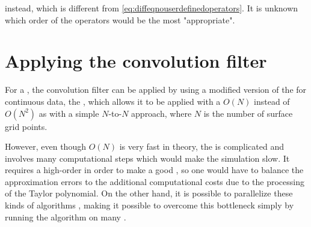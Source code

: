 instead, which is different from \eqref{eq:diffeqnouserdefinedoperators}. It is unknown which order of the operators would be the most "appropriate".

\section{Applying the convolution filter}

For a , the convolution filter can be applied by using a modified version of the \FMM{} \citep{Greengard1985,Greengard1987a} for continuous data, the \CFMM{} \citep{White1994}, which allows it to be applied with a $O(N)$  instead of $O(N^2)$ as with a simple $N$-to-$N$ approach, where $N$ is the number of surface grid points.

However, even though $O(N)$ is very fast in theory, the \CFMM is complicated and involves many computational steps which would make the simulation slow. It requires a high-order  in order to make a good \approximation, so one would have to balance the approximation errors to the additional computational costs due to the processing of the Taylor polynomial. On the other hand, it is possible to parallelize these kinds of algorithms \citep[see e.g.][]{Board1994}, making it possible to overcome this bottleneck simply by running the algorithm on many .
